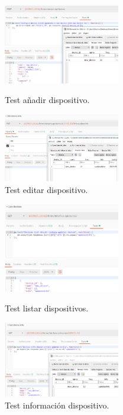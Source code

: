 \begin{figure}[!htb]
\includegraphics[width=2.00in]{images/tests/screenshots/5adddevice.PNG}
\caption{Test añadir dispositivo.}
\endminipage\hfill
{}
\includegraphics[width=2.00in]{images/tests/screenshots/6editdevice.PNG}
\caption{Test editar dispositivo.}
\endminipage\hfill
\end{figure}

\begin{figure}[!htb]
\includegraphics[width=2.00in]{images/tests/screenshots/7list_devices.PNG}
\caption{Test listar dispositivos.}
\endminipage\hfill
{}
\includegraphics[width=2.00in]{images/tests/screenshots/8device_info.PNG}
\caption{Test información dispositivo.}
\endminipage\hfill
\end{figure}

